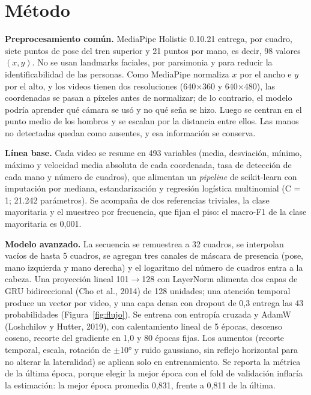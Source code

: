 \documentclass[11pt,a4paper]{article}
\begin{document}
\section{Método}

\textbf{Preprocesamiento común.} MediaPipe Holistic 0.10.21 entrega, por cuadro, siete puntos de pose del tren superior y 21 puntos por mano, es decir, 98 valores $(x, y)$. No se usan landmarks faciales, por parsimonia y para reducir la identificabilidad de las personas. Como MediaPipe normaliza $x$ por el ancho e $y$ por el alto, y los videos tienen dos resoluciones (640$\times$360 y 640$\times$480), las coordenadas se pasan a píxeles antes de normalizar; de lo contrario, el modelo podría aprender qué cámara se usó y no qué seña se hizo. Luego se centran en el punto medio de los hombros y se escalan por la distancia entre ellos. Las manos no detectadas quedan como ausentes, y esa información se conserva.

\textbf{Línea base.} Cada video se resume en 493 variables (media, desviación, mínimo, máximo y velocidad media absoluta de cada coordenada, tasa de detección de cada mano y número de cuadros), que alimentan un \emph{pipeline} de scikit-learn con imputación por mediana, estandarización y regresión logística multinomial (C = 1; 21.242 parámetros). Se acompaña de dos referencias triviales, la clase mayoritaria y el muestreo por frecuencia, que fijan el piso: el macro-F1 de la clase mayoritaria es 0,001.

\textbf{Modelo avanzado.} La secuencia se remuestrea a 32 cuadros, se interpolan vacíos de hasta 5 cuadros, se agregan tres canales de máscara de presencia (pose, mano izquierda y mano derecha) y el logaritmo del número de cuadros entra a la cabeza. Una proyección lineal 101$\rightarrow$128 con LayerNorm alimenta dos capas de GRU bidireccional (Cho et al., 2014) de 128 unidades; una atención temporal produce un vector por video, y una capa densa con dropout de 0,3 entrega las 43 probabilidades (Figura~\ref{fig:flujo}). Se entrena con entropía cruzada y AdamW (Loshchilov y Hutter, 2019), con calentamiento lineal de 5 épocas, descenso coseno, recorte del gradiente en 1,0 y 80 épocas fijas. Los aumentos (recorte temporal, escala, rotación de $\pm$10° y ruido gaussiano, sin reflejo horizontal para no alterar la lateralidad) se aplican solo en entrenamiento. Se reporta la métrica de la última época, porque elegir la mejor época con el fold de validación inflaría la estimación: la mejor época promedia 0,831, frente a 0,811 de la última.
\end{document}
